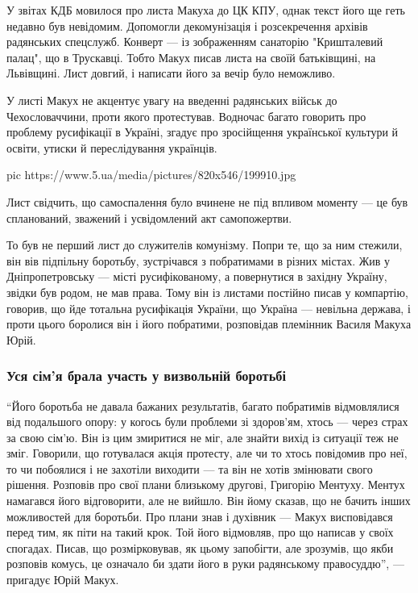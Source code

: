 У звітах КДБ мовилося про листа Макуха до ЦК КПУ, однак текст його ще
геть недавно був невідомим. Допомогли декомунізація і розсекречення
архівів радянських спецслужб. Конверт --- із зображенням санаторію
"Кришталевий палац", що в Трускавці. Тобто Макух писав листа на своїй
батьківщині, на Львівщині. Лист довгий, і написати його за вечір було
неможливо.

У листі Макух не акцентує увагу на введенні радянських військ до
Чехословаччини, проти якого протестував. Водночас багато говорить про
проблему русифікації в Україні, згадує про зросійщення української
культури й освіти, утиски й переслідування українців.

\ifcmt
pic https://www.5.ua/media/pictures/820x546/199910.jpg
\fi


Лист свідчить, що самоспалення було вчинене не під впливом моменту --- це був
спланований, зважений і усвідомлений акт самопожертви.

То був не перший лист до служителів комунізму. Попри те, що за ним стежили, він
вів підпільну боротьбу, зустрічався з побратимами в різних містах. Жив у
Дніпропетровську --- місті русифікованому, а повернутися в західну Україну,
звідки був родом, не мав права. Тому він із листами постійно писав у компартію,
говорив, що йде тотальна русифікація України, що Україна --- невільна держава, і
проти цього боролися він і його побратими, розповідав племінник Василя Макуха
Юрій.

\subsubsection{Уся сім'я брала участь у визвольній боротьбі}

\enquote{Його боротьба не давала бажаних результатів, багато побратимів
відмовлялися від подальшого опору: у когось були проблеми зі здоров'ям,
хтось --- через страх за свою сім'ю. Він із цим змиритися не міг, але знайти
вихід із ситуації теж не зміг. Говорили, що готувалася акція протесту, але
чи то хтось повідомив про неї, то чи побоялися і не захотіли виходити --- та
він не хотів змінювати свого рішення. Розповів про свої плани близькому
другові, Григорію Ментуху. Ментух намагався його відговорити, але не
вийшло. Він йому сказав, що не бачить інших можливостей для боротьби. Про
плани знав і духівник --- Макух висповідався перед тим, як піти на такий
крок. Той його відмовляв, про що написав у своїх спогадах. Писав, що
розмірковував, як цьому запобігти, але зрозумів, що якби розповів комусь,
це означало би здати його в руки радянському правосуддю}, --- пригадує Юрій
Макух.

